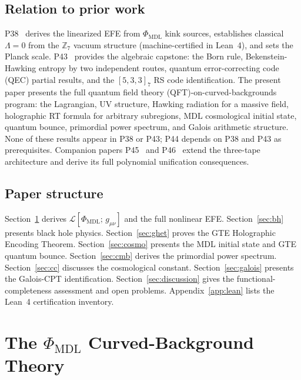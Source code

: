 \documentclass[11pt]{article}
\theoremstyle{remark}
\newcommand{\PHIMDL}{\Phi_{\mathrm{MDL}}}
\newcommand{\ZS}{\mathbb{Z}_7}
\newcommand{\LL}{\mathcal{L}}
\begin{document}
\subsection*{Relation to prior work}

P38~\cite{SpivackPhiMDLGravity} derives the linearized EFE from $\PHIMDL$ kink sources,
establishes classical $\Lambda=0$ from the $\ZS$ vacuum structure (machine-certified in
Lean~4), and sets the Planck scale.  P43~\cite{SpivackCompleteness} provides the
algebraic capstone: the Born rule, Bekenstein-Hawking entropy by two independent routes,
quantum error-correcting code (QEC) partial results, and the $[5,3,3]_7$ RS code identification.  The present paper
presents the full quantum field theory (QFT)-on-curved-backgrounds program: the Lagrangian, UV structure,
Hawking radiation for a massive field, holographic RT formula for arbitrary subregions,
MDL cosmological initial state, quantum bounce, primordial power spectrum, and Galois
arithmetic structure.  None of these results appear in P38 or P43; P44 depends on P38
and P43 as prerequisites.  Companion papers P45~\cite{SpivackThreeTapeCMCA} and
P46~\cite{SpivackGTEPolynomialUFT} extend the three-tape architecture and derive its
full polynomial unification consequences.

\subsection*{Paper structure}

Section~\ref{sec:curved} derives $\LL[\PHIMDL;\,g_{\mu\nu}]$ and the full nonlinear EFE.
Section~\ref{sec:bh} presents black hole physics.  Section~\ref{sec:ghet} proves the
GTE Holographic Encoding Theorem.  Section~\ref{sec:cosmo} presents the MDL initial
state and GTE quantum bounce.  Section~\ref{sec:cmb} derives the primordial power
spectrum.  Section~\ref{sec:cc} discusses the cosmological constant.
Section~\ref{sec:galois} presents the Galois-CPT identification.
Section~\ref{sec:discussion} gives the functional-completeness assessment and open
problems.  Appendix~\ref{app:lean} lists the Lean~4 certification inventory.

\section{The $\PHIMDL$ Curved-Background Theory}
\label{sec:curved}
\end{document}
